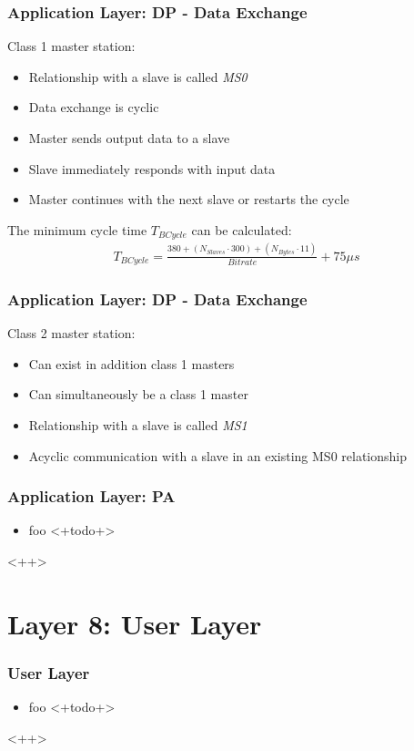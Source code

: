 \documentclass{beamer}
\begin{document}
\begin{frame}
  \frametitle{Application Layer: DP - Data Exchange}
  Class 1 master station:
  \begin{itemize}
    \item Relationship with a slave is called \textit{MS0}
    \item Data exchange is cyclic
    \item Master sends output data to a slave
    \item Slave immediately responds with input data
    \item Master continues with the next slave or restarts the cycle
  \end{itemize}
  \vspace{10pt}
  The minimum cycle time $T_{BCycle}$ can be calculated:
  \begin{align}
    T_{BCycle} = \frac{380 + (N_{Slaves} \cdot 300) + (N_{Bytes} \cdot 11)}{Bitrate} + 75
    \mu s
    \label{minimumcycletime}
  \end{align}
\end{frame}

\begin{frame}
  \frametitle{Application Layer: DP - Data Exchange}
  Class 2 master station:
  \begin{itemize}
    \item Can exist in addition class 1 masters
    \item Can simultaneously be a class 1 master
    \item Relationship with a slave is called \textit{MS1}
    \item Acyclic communication with a slave in an existing MS0 relationship
  \end{itemize}
\end{frame}

\begin{frame}
  \frametitle{Application Layer: PA}
  \begin{itemize}
    \item foo <+todo+>
  \end{itemize}<++>
\end{frame}

\section{Layer 8: User Layer}
\begin{frame}
  \frametitle{User Layer}
  \begin{itemize}
    \item foo <+todo+>
  \end{itemize}<++>
\end{frame}
\end{document}
